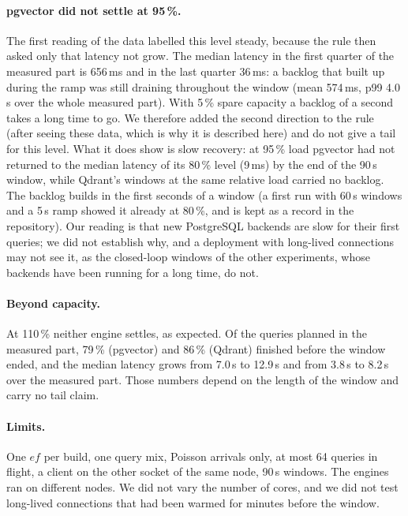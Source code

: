 \documentclass[sigconf, nonacm]{acmart}
\begin{document}
\paragraph{pgvector did not settle at 95\,\%.} The first reading of the data labelled this level steady, because the rule then asked only that latency
not grow. The median latency in the first quarter of the measured part is 656\,ms and in the last quarter 36\,ms:
a backlog that built up during the ramp was still draining throughout the window (mean 574\,ms, p99 4.0\,s over the whole measured part).
With 5\,\% spare capacity a backlog of a second takes a long time to go. We therefore added the second direction to the rule (after seeing these
data, which is why it is described here) and do not give a tail for this level. What it does show is slow recovery: at 95\,\% load pgvector had not returned to the median latency of its 80\,\% level
(9\,ms) by the end of the 90\,s window, while Qdrant's windows at the same relative load carried no backlog. The backlog builds in the first
seconds of a window (a first run with 60\,s windows and a 5\,s ramp showed it already at 80\,\%, and is kept as a record in the repository).
Our reading is that new PostgreSQL backends are slow for their first queries; we did not establish why, and a deployment with long-lived connections
may not see it, as the closed-loop windows of the other experiments, whose backends have been running for a long time, do not.

\paragraph{Beyond capacity.} At 110\,\% neither engine settles, as expected. Of the queries planned in the measured part, 79\,\% (pgvector) and 86\,\% (Qdrant)
finished before the window ended, and the median latency grows from 7.0\,s to 12.9\,s and from 3.8\,s to 8.2\,s over the
measured part. Those numbers depend on the length of the window and carry no tail claim.

\paragraph{Limits.} One $ef$ per build, one query mix, Poisson arrivals only, at most 64 queries in flight, a client on the other socket of the same node, 90\,s windows. The
engines ran on different nodes. We did not vary the number of cores, and we did not test long-lived connections that had been warmed for minutes before the window.
\end{document}

